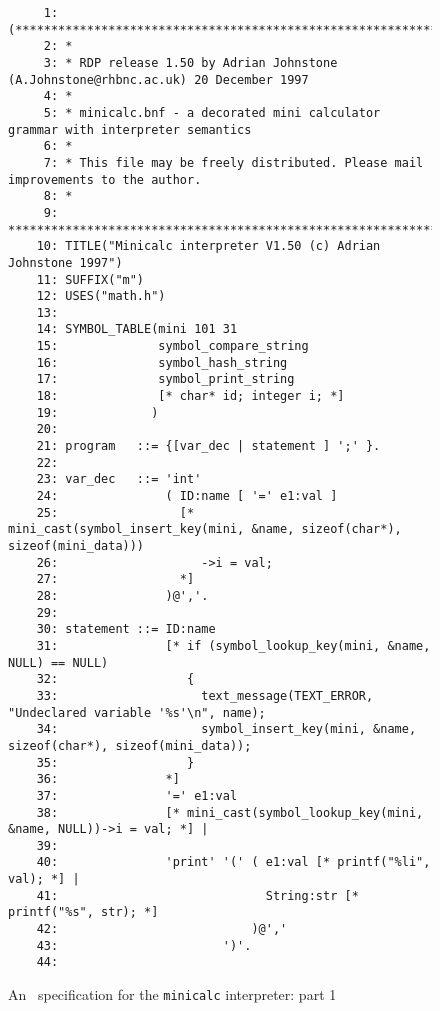 \begin{figure}
\hspace*{-2.5cm}
\begin{minipage}{30cm}
\footnotesize
\begin{verbatim}
     1: (*******************************************************************************
     2: *
     3: * RDP release 1.50 by Adrian Johnstone (A.Johnstone@rhbnc.ac.uk) 20 December 1997
     4: *
     5: * minicalc.bnf - a decorated mini calculator grammar with interpreter semantics
     6: *
     7: * This file may be freely distributed. Please mail improvements to the author.
     8: *
     9: *******************************************************************************)
    10: TITLE("Minicalc interpreter V1.50 (c) Adrian Johnstone 1997")
    11: SUFFIX("m")
    12: USES("math.h")
    13: 
    14: SYMBOL_TABLE(mini 101 31
    15:              symbol_compare_string
    16:              symbol_hash_string
    17:              symbol_print_string
    18:              [* char* id; integer i; *]
    19:             )
    20: 
    21: program   ::= {[var_dec | statement ] ';' }.
    22: 
    23: var_dec   ::= 'int'
    24:               ( ID:name [ '=' e1:val ]
    25:                 [* mini_cast(symbol_insert_key(mini, &name, sizeof(char*), sizeof(mini_data)))
    26:                    ->i = val; 
    27:                 *]
    28:               )@','.
    29: 
    30: statement ::= ID:name
    31:               [* if (symbol_lookup_key(mini, &name, NULL) == NULL)
    32:                  {
    33:                    text_message(TEXT_ERROR, "Undeclared variable '%s'\n", name);
    34:                    symbol_insert_key(mini, &name, sizeof(char*), sizeof(mini_data));
    35:                  }
    36:               *]
    37:               '=' e1:val
    38:               [* mini_cast(symbol_lookup_key(mini, &name, NULL))->i = val; *] |
    39: 
    40:               'print' '(' ( e1:val [* printf("%li", val); *] |
    41:                             String:str [* printf("%s", str); *]
    42:                           )@','
    43:                       ')'.
    44: 
\end{verbatim}
\end{minipage}
\caption{An \rdp\ specification for the {\tt minicalc} interpreter: part 1}
\label{minicalc:interp1}
\end{figure}

